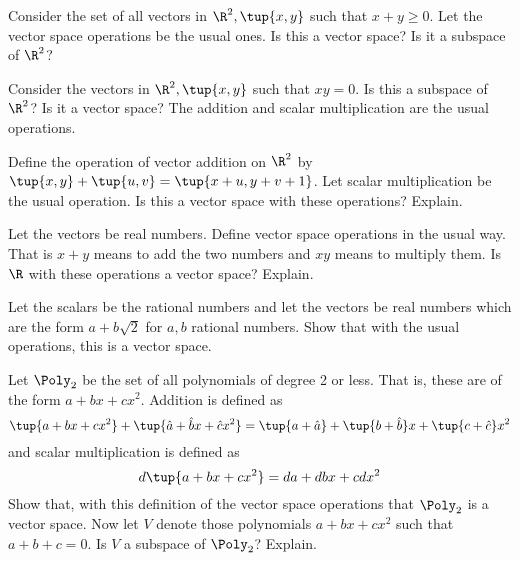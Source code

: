 \begin{enumialphparenastyle}
\begin{ex} Consider the set of all vectors in $\R^{2},\tup{x,y} $
such that $x+y\geq 0$. Let the vector space operations be the usual ones. Is
this a vector space? Is it a subspace of $\R^{2}$?
\end{ex}

\begin{ex} Consider the vectors in $\R^{2},\tup{x,y} $ such that $xy=0$. Is this a subspace of $\R^{2}$? Is it a vector space? The
addition and scalar multiplication are the usual operations.
\end{ex}

\begin{ex} Define the operation of vector addition on $\R^{2}$ by $\tup{
x,y} +\tup{u,v} =\tup{x+u,y+v+1} $. Let scalar
multiplication be the usual operation. Is this a vector space with these
operations? Explain.
\end{ex}

\begin{ex} Let the vectors be real numbers. Define vector space operations in the
usual way. That is $x+y$ means to add the two numbers and $xy$ means to
multiply them. Is $\R$ with these operations a vector space? Explain.
\end{ex}

\begin{ex} Let the scalars be the rational numbers and let the vectors be
real numbers which are the form $a+b\sqrt{2}$ for $a,b$ rational numbers.
Show that with the usual operations, this is a vector space.
\end{ex}

\begin{ex} Let $\Poly_{2}$ be the set of all polynomials of degree 2 or
less. That is, these are of the form $a+bx+cx^{2}$. Addition is defined as 
\begin{equation*}
\tup{a+bx+cx^{2}} +\tup{\hat{a}+\hat{b}x+\hat{c}x^{2}}
=\tup{a+\hat{a}} +\tup{b+\hat{b}} x+\tup{c+\hat{c}}
x^{2}
\end{equation*}
and scalar multiplication is defined as 
\begin{equation*}
d\tup{a+bx+cx^{2}} =da+dbx+cdx^{2}
\end{equation*}
Show that, with this definition of the vector space operations that $\Poly_{2}$ is a vector space. Now let $V$ denote those polynomials $a+bx+cx^{2}$
such that $a+b+c=0$. Is $V$ a subspace of $\Poly_{2}$? Explain.
\end{ex}


\end{enumialphparenastyle}
